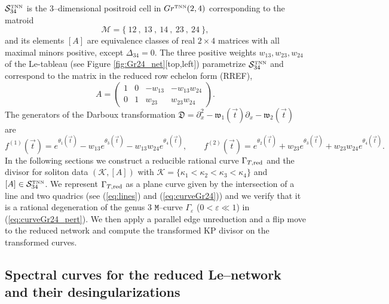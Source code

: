 \documentclass[11pt]{amsart}
\theoremstyle{plain}
\numberwithin{equation}{section}
\begin{document}
${\mathcal S}_{34}^{\mbox{\tiny TNN}}$ is the 3--dimensional positroid cell in $Gr^{\mbox{\tiny TNN}} (2,4)$ corresponding to the matroid
\[
{\mathcal M} = \{ \ 12 \ , \ 13 \ , \ 14 \ ,\ 23 \ , \ 24\ \},
\]
and its elements $[A]$ are equivalence classes of real $2\times 4$ matrices with all maximal minors positive, except $\Delta_{34}=0$. The three positive weights $w_{13},w_{23},w_{24}$ of the Le-tableau (see Figure \ref{fig:Gr24_net}[top,left]) parametrize ${\mathcal S}_{34}^{\mbox{\tiny TNN}}$ and correspond to the matrix in the reduced row echelon form (RREF),
\begin{equation}
\label{eq:RREF}
A = \left( \begin{array}{cccc}
1 & 0 & - w_{13} & -w_{13} w_{24}\\
0 & 1 & w_{23}   & w_{23}w_{24}
\end{array}
\right).
\end{equation}
The generators of the Darboux transformation ${\mathfrak D}=\partial_x^2 -{\mathfrak w}_1 (\vec t)\partial_x -{\mathfrak w}_2(\vec t)$ are
\begin{equation}\label{eq:gen_f2}
f^{(1)} (\vec t) = e^{\theta_1(\vec t)} -w_{13}e^{\theta_3(\vec t)}-w_{13} w_{24}e^{\theta_4(\vec t)}, \quad\quad
f^{(2)} (\vec t) = e^{\theta_2(\vec t)} +w_{23}e^{\theta_3(\vec t)}+w_{23}w_{24}e^{\theta_4(\vec t)}.
\end{equation}
In the following sections we construct a reducible rational curve $\Gamma_{T,\mbox{\scriptsize red}}$ and the divisor for soliton data $({\mathcal K}, [A])$ with $\mathcal K = \{ \kappa_1 < \kappa_2<\kappa_3<\kappa_4\}$ and $[A] \in {\mathcal S}_{34}^{\mbox{\tiny TNN}}$. We represent $\Gamma_{T,\mbox{\scriptsize red}}$ as a plane curve given by the intersection of a line and two quadrics (see (\ref{eq:lines}) and (\ref{eq:curveGr24})) and we verify that it is a rational degeneration of the genus 3 $\mathtt M$--curve $\Gamma_{\varepsilon}$ ($0<\varepsilon \ll 1$) in (\ref{eq:curveGr24_pert}). We then apply a parallel edge unreduction and a flip move to the reduced network and compute the transformed KP divisor on the transformed curves.

\subsection{Spectral curves for the reduced Le--network and their desingularizations}\label{sec:gamma_24}
\end{document}
